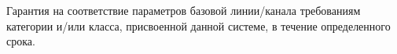 Гарантия на соответствие параметров базовой линии/канала 
требованиям категории и/или класса, присвоенной данной
системе, в течение определенного срока.